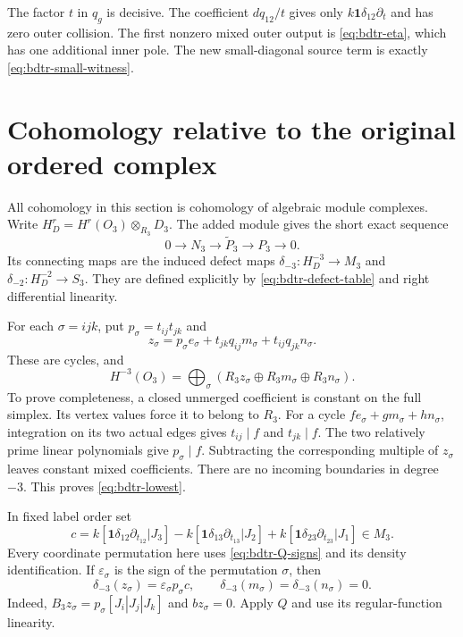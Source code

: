 The factor $t$ in $q_g$ is decisive.
The coefficient $dq_{12}/t$ gives only $k\mathbf1\delta_{12}\partial_t$ and has zero outer collision.
The first nonzero mixed outer output is \eqref{eq:bdtr-eta}, which has one additional inner pole.
The new small-diagonal source term is exactly \eqref{eq:bdtr-small-witness}.

\section{Cohomology relative to the original ordered complex}

All cohomology in this section is cohomology of algebraic module complexes.
Write $H_D^r=H^r(O_3)\otimes_{R_3}D_3$.
The added module gives the short exact sequence
\[
 0\longrightarrow N_3\longrightarrow\widetilde P_3
     \longrightarrow P_3\longrightarrow0.
\]
Its connecting maps are the induced defect maps
$\delta_{-3}:H_D^{-3}\to M_3$ and $\delta_{-2}:H_D^{-2}\to S_3$.
They are defined explicitly by \eqref{eq:bdtr-defect-table} and right differential linearity.

For each $\sigma=ijk$, put $p_\sigma=t_{ij}t_{jk}$ and
\[
 z_\sigma=p_\sigma e_\sigma+t_{jk}q_{ij}m_\sigma+t_{ij}q_{jk}n_\sigma.
\]
These are cycles, and
\begin{equation}\label{eq:bdtr-lowest}
 H^{-3}(O_3)=\bigoplus_\sigma
       (R_3z_\sigma\oplus R_3m_\sigma\oplus R_3n_\sigma).
\end{equation}
To prove completeness, a closed unmerged coefficient is constant on the full simplex.
Its vertex values force it to belong to $R_3$.
For a cycle $fe_\sigma+gm_\sigma+hn_\sigma$, integration on its two actual edges gives
$t_{ij}\mid f$ and $t_{jk}\mid f$.
The two relatively prime linear polynomials give $p_\sigma\mid f$.
Subtracting the corresponding multiple of $z_\sigma$ leaves constant mixed coefficients.
There are no incoming boundaries in degree $-3$.
This proves \eqref{eq:bdtr-lowest}.

In fixed label order set
\[
 c=k[\mathbf1\delta_{12}\partial_{t_{12}}|J_3]
    -k[\mathbf1\delta_{13}\partial_{t_{13}}|J_2]
    +k[\mathbf1\delta_{23}\partial_{t_{23}}|J_1]\in M_3.
\]
Every coordinate permutation here uses \eqref{eq:bdtr-Q-signs} and its density identification.
If $\varepsilon_\sigma$ is the sign of the permutation $\sigma$, then
\begin{equation}\label{eq:bdtr-connecting}
 \delta_{-3}(z_\sigma)=\varepsilon_\sigma p_\sigma c,
 \qquad \delta_{-3}(m_\sigma)=\delta_{-3}(n_\sigma)=0.
\end{equation}
Indeed, $B_3z_\sigma=p_\sigma[J_i|J_j|J_k]$ and $bz_\sigma=0$.
Apply $Q$ and use its regular-function linearity.

